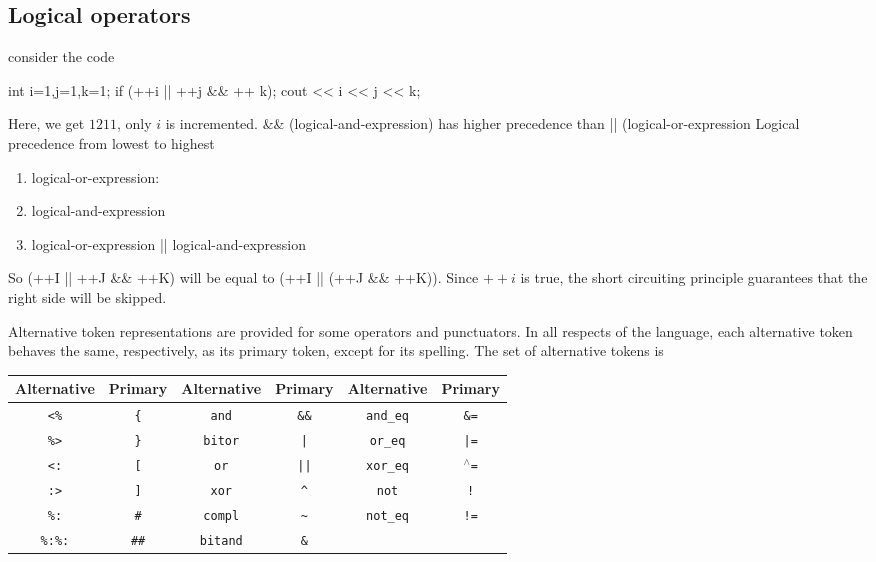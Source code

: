 \documentclass{report}
\begin{document}
\pagebreak 
{}
\bigbreak \noindent 
\subsection{Logical operators}
\bigbreak \noindent 
consider the code
\bigbreak \noindent 
\begin{cppcode}
int i=1,j=1,k=1;
if (++i || ++j && ++ k);
cout << i << j << k;
\end{cppcode}
\bigbreak \noindent 
Here, we get $1211$, only $i$ is incremented. \&\& (logical-and-expression) has higher precedence than || (logical-or-expression
\bigbreak \noindent 
Logical precedence from lowest to highest
\begin{enumerate}
    \item logical-or-expression:
    \item logical-and-expression
    \item logical-or-expression || logical-and-expression
\end{enumerate}
\bigbreak \noindent 
So (++I || ++J \&\& ++K) will be equal to (++I || (++J \&\& ++K)). Since $++i$ is true, the short circuiting principle guarantees that the right side will be skipped.


\pagebreak 
{}
\bigbreak \noindent 
Alternative token representations are provided for some operators and punctuators. In all respects of the language, each alternative token behaves the same, respectively, as its primary token, except for its spelling. The set of alternative tokens is
\begin{center}
    \begin{tabular}{|c|c||c|c||c|c|}
        \hline
        \textbf{Alternative} & \textbf{Primary} & \textbf{Alternative} & \textbf{Primary} & \textbf{Alternative} & \textbf{Primary} \\
        \hline
        \texttt{<\%} & \texttt{\{} & \texttt{and} & \texttt{\&\&} & \texttt{and\_eq} & \texttt{\&=} \\
            \hline
        \texttt{\%>} & \texttt{\}} & \texttt{bitor} & \texttt{|} & \texttt{or\_eq} & \texttt{|=} \\
        \hline
        \texttt{<:} & \texttt{[} & \texttt{or} & \texttt{||} & \texttt{xor\_eq} & \texttt{$^{\land}$=} \\
        \hline
        \texttt{:>} & \texttt{]} & \texttt{xor} & \texttt{\^} & \texttt{not} & \texttt{!} \\
        \hline
        \texttt{\%:} & \texttt{\#} & \texttt{compl} & \texttt{\~} & \texttt{not\_eq} & \texttt{!=} \\
        \hline
        \texttt{\%:\%:} & \texttt{\#\#} & \texttt{bitand} & \texttt{\&} &  &  \\
        \hline
    \end{tabular}
\end{center}
\end{document}
